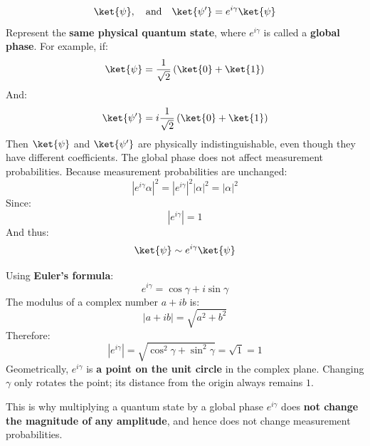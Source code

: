 \begin{equation*}
    \ket{\psi}, \quad \text{and} \quad \ket{\psi'} = e^{i\gamma}\ket{\psi}
\end{equation*}
Represent the \textbf{same physical quantum state}, where $e^{i\gamma}$ is called a \textbf{global phase}. For example, if:
\begin{equation*}
    \ket{\psi} = \frac{1}{\sqrt{2}} \left(\ket{0} + \ket{1}\right)
\end{equation*}
And:
\begin{equation*}
    \ket{\psi'} = i \frac{1}{\sqrt{2}} \left(\ket{0} + \ket{1}\right)
\end{equation*}
Then $\ket{\psi}$ and $\ket{\psi'}$ are physically indistinguishable, even though they have different coefficients. The global phase does not affect measurement probabilities. Because measurement probabilities are unchanged:
\begin{equation*}
    \left|e^{i \gamma} \alpha\right|^2 = \left|e^{i \gamma}\right|^2 |\alpha|^2 = |\alpha|^2
\end{equation*}
Since:
\begin{equation*}
    \left|e^{i \gamma}\right| = 1
\end{equation*}
And thus:
\begin{equation*}
    \ket{\psi} \sim e^{i\gamma} \ket{\psi}
\end{equation*}

\begin{remarkbox}[: Why is $\left|e^{i \gamma}\right| = 1$?]
    Using \textbf{Euler's formula}:
    \begin{equation*}
        e^{i\gamma}=\cos\gamma+i\sin\gamma
    \end{equation*}
    The modulus of a complex number $a+ib$ is:
    \begin{equation*}
        \left|a+ib\right|=\sqrt{a^2+b^2}
    \end{equation*}
    Therefore:
    \begin{equation*}
        \left|e^{i\gamma}\right|
        =
        \sqrt{\cos^2\gamma+\sin^2\gamma}
        =
        \sqrt{1}
        =
        \boxed{1}
    \end{equation*}
    Geometrically, $e^{i\gamma}$ is \textbf{a point on the unit circle} in the complex plane. Changing $\gamma$ only rotates the point; its distance from the origin always remains $1$.

    \highspace
    This is why multiplying a quantum state by a global phase $e^{i\gamma}$ does \textbf{not change the magnitude of any amplitude}, and hence does not change measurement probabilities.
\end{remarkbox}

